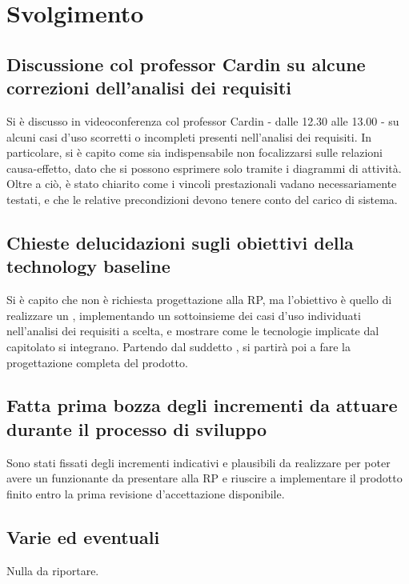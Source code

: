 \newpage
\section*{Svolgimento}

	\subsection*{Discussione col professor Cardin su alcune correzioni dell'analisi dei requisiti}
		Si è discusso in videoconferenza col professor Cardin - dalle 12.30 alle 13.00 - su alcuni casi d'uso scorretti o incompleti presenti nell'analisi dei requisiti. In particolare, si è capito come sia indispensabile non focalizzarsi sulle relazioni causa-effetto, dato che si possono esprimere solo tramite i diagrammi di attività.
		Oltre a ciò, è stato chiarito come i vincoli prestazionali vadano necessariamente testati, e che le relative precondizioni devono tenere conto del carico di sistema.

	\subsection*{Chieste delucidazioni sugli obiettivi della technology baseline}
		Si è capito che non è richiesta progettazione alla RP, ma l'obiettivo è quello di realizzare un , implementando un sottoinsieme dei casi d'uso individuati nell'analisi dei requisiti a scelta, e mostrare come le tecnologie implicate dal capitolato si integrano. Partendo dal suddetto , si partirà poi a fare la progettazione completa del prodotto.

	\subsection*{Fatta prima bozza degli incrementi da attuare durante il processo di sviluppo}
		Sono stati fissati degli incrementi indicativi e plausibili da realizzare per poter
		avere un  funzionante da presentare alla RP e riuscire a implementare il prodotto finito entro la prima revisione d'accettazione disponibile.

	\subsection*{Varie ed eventuali}
		Nulla da riportare.
